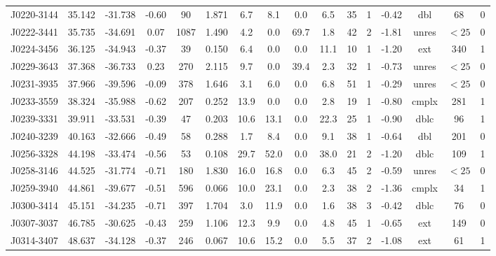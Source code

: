\documentclass{mnras}
\begin{document}
\begin{table*}
\begin{tabular}{cccccccccccccccc}
J0220-3144 & 35.142 & -31.738 & -0.60 & 90 & 1.871 & 6.7 & 8.1 & 0.0 & 6.5 & 35 & 1 & -0.42 & dbl & 68 & 0 \\ 

J0222-3441 & 35.735 & -34.691 & 0.07 & 1087 & 1.490 & 4.2 & 0.0 & 69.7 & 1.8 & 42 & 2 & -1.81 & unres & $<25$ & 0 \\ 

J0224-3456 & 36.125 & -34.943 & -0.37 & 39 & 0.150 & 6.4 & 0.0 & 0.0 & 11.1 & 10 & 1 & -1.20 & ext & 340 & 1 \\ 

J0229-3643 & 37.368 & -36.733 & 0.23 & 270 & 2.115 & 9.7 & 0.0 & 39.4 & 2.3 & 32 & 1 & -0.73 & unres & $<25$ & 0 \\ 

J0231-3935 & 37.966 & -39.596 & -0.09 & 378 & 1.646 & 3.1 & 6.0 & 0.0 & 6.8 & 51 & 1 & -0.29 & unres & $<25$ & 0 \\ 

J0233-3559 & 38.324 & -35.988 & -0.62 & 207 & 0.252 & 13.9 & 0.0 & 0.0 & 2.8 & 19 & 1 & -0.80 & cmplx & 281 & 1 \\ 

J0239-3331 & 39.911 & -33.531 & -0.39 & 47 & 0.203 & 10.6 & 13.1 & 0.0 & 22.3 & 25 & 1 & -0.90 & dblc & 96 & 1 \\ 

J0240-3239 & 40.163 & -32.666 & -0.49 & 58 & 0.288 & 1.7 & 8.4 & 0.0 & 9.1 & 38 & 1 & -0.64 & dbl & 201 & 0 \\ 

J0256-3328 & 44.198 & -33.474 & -0.56 & 53 & 0.108 & 29.7 & 52.0 & 0.0 & 38.0 & 21 & 2 & -1.20 & dblc & 109 & 1 \\ 

J0258-3146 & 44.525 & -31.774 & -0.71 & 180 & 1.830 & 16.0 & 16.8 & 0.0 & 6.3 & 45 & 2 & -0.59 & unres & $<25$ & 0 \\ 

J0259-3940 & 44.861 & -39.677 & -0.51 & 596 & 0.066 & 10.0 & 23.1 & 0.0 & 2.3 & 38 & 2 & -1.36 & cmplx & 34 & 1 \\ 

J0300-3414 & 45.151 & -34.235 & -0.71 & 397 & 1.704 & 3.0 & 11.9 & 0.0 & 1.6 & 38 & 3 & -0.42 & dblc & 76 & 0 \\ 

J0307-3037 & 46.785 & -30.625 & -0.43 & 259 & 1.106 & 12.3 & 9.9 & 0.0 & 4.8 & 45 & 1 & -0.65 & ext & 149 & 0 \\ 

J0314-3407 & 48.637 & -34.128 & -0.37 & 246 & 0.067 & 10.6 & 15.2 & 0.0 & 5.5 & 37 & 2 & -1.08 & ext & 61 & 1 \\ 


\end{tabular}
\end{table*}
\end{document}
